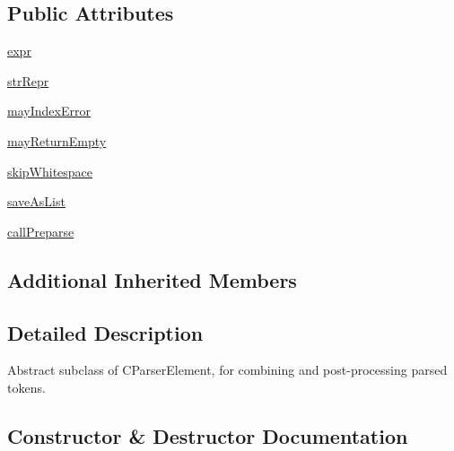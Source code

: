 \subsection*{Public Attributes}
\begin{DoxyCompactItemize}
\item 
\hyperlink{classpkg__resources_1_1__vendor_1_1pyparsing_1_1ParseElementEnhance_a34e02b3404b2a545ca1be8b522758896}{expr}
\item 
\hyperlink{classpkg__resources_1_1__vendor_1_1pyparsing_1_1ParseElementEnhance_a8921a466c253eccd736c6033f3a8aa4d}{str\+Repr}
\item 
\hyperlink{classpkg__resources_1_1__vendor_1_1pyparsing_1_1ParseElementEnhance_a55125656b13bd5297f6b4fd2bc771481}{may\+Index\+Error}
\item 
\hyperlink{classpkg__resources_1_1__vendor_1_1pyparsing_1_1ParseElementEnhance_a8823f3f13727503ad0b1dcbdf236d95b}{may\+Return\+Empty}
\item 
\hyperlink{classpkg__resources_1_1__vendor_1_1pyparsing_1_1ParseElementEnhance_a902e9037c0ac276951b44ca23ffa7876}{skip\+Whitespace}
\item 
\hyperlink{classpkg__resources_1_1__vendor_1_1pyparsing_1_1ParseElementEnhance_a76d9c4177447649dfbc323acfed06ae3}{save\+As\+List}
\item 
\hyperlink{classpkg__resources_1_1__vendor_1_1pyparsing_1_1ParseElementEnhance_af6e15e2325acca7b00b11cd3eeddcbc6}{call\+Preparse}
\end{DoxyCompactItemize}
\subsection*{Additional Inherited Members}


\subsection{Detailed Description}
\begin{DoxyVerb}Abstract subclass of C{ParserElement}, for combining and post-processing parsed tokens.
\end{DoxyVerb}
 

\subsection{Constructor \& Destructor Documentation}
\mbox{\label{classpkg__resources_1_1__vendor_1_1pyparsing_1_1ParseElementEnhance_ad18f0af506a0d9477e2833556a00ac45}} 
